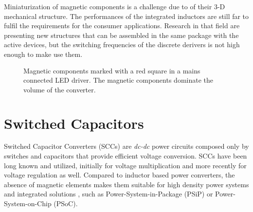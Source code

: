 Miniaturization of magnetic components is a challenge due to of their 3-D mechanical structure.
The performances of the integrated inductors are still far to fulfil the requirements for the consumer applications.  Research in that field are presenting new structures that can be assembled in the same package with the active devices, but the switching frequencies of the discrete derivers is not high enough to make use them.

\begin{figure}[!h]
\centering
{}
\caption{Magnetic components marked with a red square in a mains connected LED driver. The magnetic components dominate the volume of the converter.}
\label{fig:smps_driver}
\end{figure}






\section{Switched Capacitors}
Switched Capacitor Converters (SCCs) are \emph{dc-dc} power circuits composed only by switches and capacitors that provide efficient voltage conversion. SCCs have been long known and utilized, initially for voltage multiplication and more recently for voltage regulation as well. Compared to inductor based power converters, the absence of magnetic elements makes them suitable for high density power systems and integrated solutions , such as Power-System-in-Package (PSiP) or Power-System-on-Chip (PSoC).

